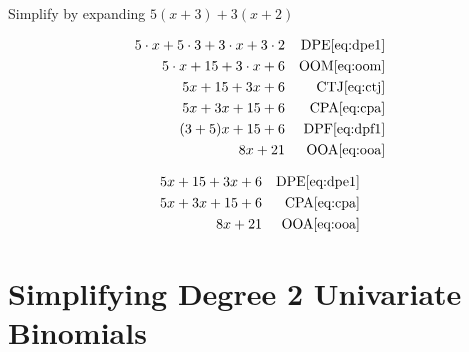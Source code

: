 \documentclass[20150903-160354-rs2.2-MarksMathNotebook.tex]{subfiles}
\begin{document}
\begin{example}[id:20141109-095842] \label{20141109-095842}  \hfill \\

Simplify by expanding $5(x+3)+3(x+2)$

\soln

\solnsteps
\begin{align*}
5 \cdot x + 5 \cdot 3 + 3 \cdot x + 3 \cdot 2 && \text{DPE} \eqref{eq:dpe1} \\
5 \cdot x + 15 + 3 \cdot x + 6 && \text{OOM} \eqref{eq:oom} \\
5x + 15 + 3x+6 && \text{CTJ} \eqref{eq:ctj} \\
5x +3x+ 15 + 6 && \text{CPA} \eqref{eq:cpa} \\
(3+5)x+15+6 && \text{DPF} \eqref{eq:dpf1} \\
8x+21 && \text{OOA} \eqref{eq:ooa}
\end{align*}

\soln

\lesssteps
\begin{align*}
5x + 15 +3x+6 && \text{DPE} \eqref{eq:dpe1} \\
5x+3x+15+6 && \text{CPA} \eqref{eq:cpa} \\
8x+21 && \text{OOA} \eqref{eq:ooa}
\end{align*}

\end{example}


\section{Simplifying Degree 2 Univariate Binomials}\label{Simplifying Degree 2 Univariate Binomials}
\end{document}
